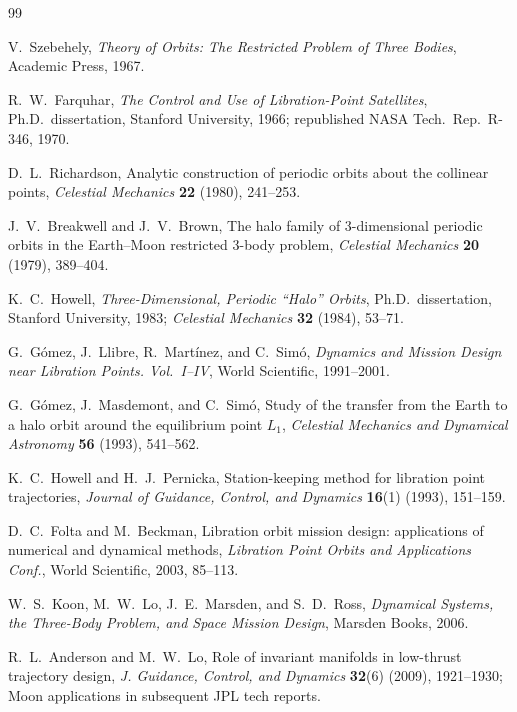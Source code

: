 \documentclass[11pt,a4paper]{article}
\begin{document}
\begin{thebibliography}{99}

V.~Szebehely, \textit{Theory of Orbits: The Restricted Problem of Three Bodies}, Academic Press, 1967.

R.~W.~Farquhar, \textit{The Control and Use of Libration-Point Satellites}, Ph.D.\ dissertation, Stanford University, 1966; republished NASA Tech.\ Rep.\ R-346, 1970.

D.~L.~Richardson, Analytic construction of periodic orbits about the collinear points, \textit{Celestial Mechanics} \textbf{22} (1980), 241--253.

J.~V.~Breakwell and J.~V.~Brown, The halo family of 3-dimensional periodic orbits in the Earth--Moon restricted 3-body problem, \textit{Celestial Mechanics} \textbf{20} (1979), 389--404.

K.~C.~Howell, \textit{Three-Dimensional, Periodic ``Halo'' Orbits}, Ph.D.\ dissertation, Stanford University, 1983; \textit{Celestial Mechanics} \textbf{32} (1984), 53--71.

G.~G\'omez, J.~Llibre, R.~Mart\'inez, and C.~Sim\'o, \textit{Dynamics and Mission Design near Libration Points. Vol.~I--IV}, World Scientific, 1991--2001.

G.~G\'omez, J.~Masdemont, and C.~Sim\'o, Study of the transfer from the Earth to a halo orbit around the equilibrium point $L_1$, \textit{Celestial Mechanics and Dynamical Astronomy} \textbf{56} (1993), 541--562.

K.~C.~Howell and H.~J.~Pernicka, Station-keeping method for libration point trajectories, \textit{Journal of Guidance, Control, and Dynamics} \textbf{16}(1) (1993), 151--159.

D.~C.~Folta and M.~Beckman, Libration orbit mission design: applications of numerical and dynamical methods, \textit{Libration Point Orbits and Applications Conf.}, World Scientific, 2003, 85--113.

W.~S.~Koon, M.~W.~Lo, J.~E.~Marsden, and S.~D.~Ross, \textit{Dynamical Systems, the Three-Body Problem, and Space Mission Design}, Marsden Books, 2006.

R.~L.~Anderson and M.~W.~Lo, Role of invariant manifolds in low-thrust trajectory design, \textit{J. Guidance, Control, and Dynamics} \textbf{32}(6) (2009), 1921--1930; Moon applications in subsequent JPL tech reports.


\end{thebibliography}
\end{document}

